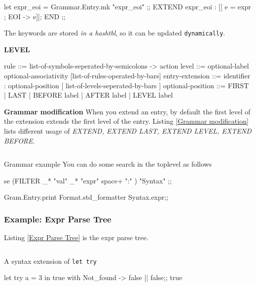 \begin{ocamlcode}
let expr_eoi = Grammar.Entry.mk "expr_eoi" ;;
EXTEND expr_eoi : [[ e = expr ; EOI -> e]]; END ;;
\end{ocamlcode}

The keywords are stored \textit{ in a hashtbl}, so it can be updated
\verb|dynamically|.

\textbf{LEVEL} \\
  \begin{bluetext}
  rule ::= list-of-symbols-seperated-by-semicolons -> action 
  level ::=  optional-label optional-associativity
  [list-of-rules-operated-by-bars] 
  entry-extension ::=
  identifier : optional-position  [ list-of-levels-seperated-by-bars ] 
  optional-position ::= FIRST | LAST | BEFORE label | AFTER label |
  LEVEL label  
  \end{bluetext}
\textbf{Grammar modification} When you extend an entry, by default
   the first level of the extension extends the first level of
   the entry.
   Listing \ref{Grammar modification} lists different usage of \textit{EXTEND, EXTEND LAST,  EXTEND LEVEL, EXTEND BEFORE}.

   \inputminted[fontsize=\scriptsize]{ocaml}{code/camlp4/grmmar_modification/first.ml}

Grammar example
  You can do some search in the toplevel as follows

\begin{ocamlcode}
se (FILTER _* "val" _* "expr" space+ ":" ) "Syntax" ;;
\end{ocamlcode}

\begin{ocamlcode}  
Gram.Entry.print Format.std_formatter Syntax.expr;;
\end{ocamlcode}

\subsubsection{Example: Expr Parse Tree}
Listing \ref{Expr Parse Tree}   is the expr parse tree.
\inputminted[fontsize=\scriptsize]{ocaml}{code/camlp4/expr_parse_tree/first.ml}


A syntax extension of \verb|let try|

\begin{ocamlcode}
let try a = 3 in true with Not_found -> false || false;;
true  
\end{ocamlcode}

